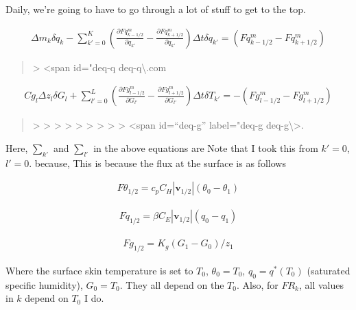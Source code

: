 Daily, we're going to have to go through a lot of stuff to get to the
top.

\begin{eqnarray}
  \Delta m_k \delta q_k
  -  \sum_{k'=0}^{K} \left(  \frac{\partial Fq^{m}_{k-1/2}}{\partial q_{k'}}
                            - \frac{\partial Fq^{m}_{k+1/2}}{\partial q_{k'}} \right)
                 \Delta t\delta q_{k'}
  = ( Fq^{m}_{k-1/2} - Fq^{m}_{k+1/2} )
\end{eqnarray}

\begin{quote}
\blaze\textgreater{} \textless span id="deq-q
deq-q\textbackslash{}\blind\blind\blind.com
\end{quote}

\begin{eqnarray}
  Cg_l \Delta z_l \delta G_l
  +  \sum_{l'=0}^{L} \left(  \frac{\partial Fg^{m}_{l-1/2}}{\partial G_{l'}}
                            - \frac{\partial Fg^{m}_{l+1/2}}{\partial G_{l'}} \right)
                 \Delta t\delta T_{k'}
  = - ( Fg^{m}_{l-1/2} - Fg^{m}_{l+1/2} )
\end{eqnarray}

\begin{quote}
\protect\hypertarget{deq-g}{}{\blaze\textgreater{} }
\protect\hypertarget{deq-g}{}{\blaze\textgreater{} }
\protect\hypertarget{deq-g}{}{\blaze\textgreater{} }
\protect\hypertarget{deq-g}{}{\blaze\textgreater{} }
\blaze\textgreater{} \blaze\textgreater{} \blaze\textgreater{}
\blaze\textgreater{} \blaze\textgreater{} \textless span id=``deq-g''
label="deq-g deq-g\textbackslash{}\blur\textgreater.
\end{quote}

Here, \(\sum_{k'}\) and \(\sum_{l'}\) in the above equations are Note
that I took this from \(k'=0\), \(l'=0\). because, This is because the
flux at the surface is as follows

\begin{eqnarray}
  F\theta_{1/2} =  c_p C_H |\mathbf{v}_{1/2}| (\theta_0 - \theta_1)
\end{eqnarray}

\begin{eqnarray}
  Fq_{1/2} =  \beta C_E |\mathbf{v}_{1/2}| (q_0 - q_1)
\end{eqnarray}

\begin{eqnarray}
  Fg_{1/2} =  K_g (G_1 - G_0)/z_1
\end{eqnarray}

Where the surface skin temperature is set to \(T_0\),
\(\theta_0 = T_0\), \(q_0 = q^*(T_0)\) (saturated specific humidity),
\(G_0 = T_0\). They all depend on the \(T_0\). Also, for \(FR_{k}\), all
values in \(k\) depend on \(T_0\) I do.

